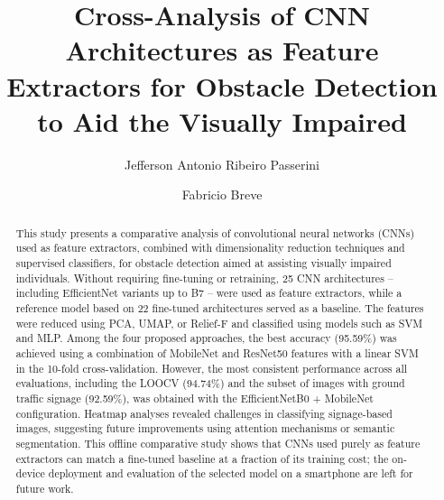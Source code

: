 \documentclass[final,5p,times,twocolumn]{elsarticle}
\begin{document}
\begin{frontmatter}



\title{Cross-Analysis of CNN Architectures as Feature Extractors for Obstacle Detection to Aid the Visually Impaired}


\author{Jefferson Antonio Ribeiro Passerini}
\author{Fabricio Breve}
\address{Institute of Geosciences and Exact Sciences,
	S\~{a}o Paulo State University (UNESP), Rio Claro, SP, 13506-900, Brazil}
	
\begin{abstract}
	This study presents a comparative analysis of convolutional neural networks (CNNs) used as feature extractors, combined with dimensionality reduction techniques and supervised classifiers, for obstacle detection aimed at assisting visually impaired individuals. Without requiring fine-tuning or retraining, 25 CNN architectures -- including EfficientNet variants up to B7 -- were used as feature extractors, while a reference model based on 22 fine-tuned architectures served as a baseline. The features were reduced using PCA, UMAP, or Relief-F and classified using models such as SVM and MLP. Among the four proposed approaches, the best accuracy (95.59\%) was achieved using a combination of MobileNet and ResNet50 features with a linear SVM in the 10-fold cross-validation. However, the most consistent performance across all evaluations, including the LOOCV (94.74\%) and the subset of images with ground traffic signage (92.59\%), was obtained with the EfficientNetB0 + MobileNet configuration. Heatmap analyses revealed challenges in classifying signage-based images, suggesting future improvements using attention mechanisms or semantic segmentation. This offline comparative study shows that CNNs used purely as feature extractors can match a fine-tuned baseline at a fraction of its training cost; the on-device deployment and evaluation of the selected model on a smartphone are left for future work.
\end{abstract}


\end{frontmatter}
\end{document}
